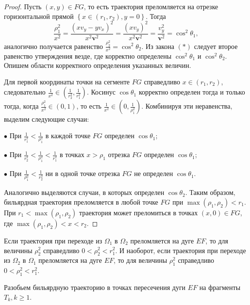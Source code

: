 \begin{proof}
Пусть $(x,y) \in FG$, то есть траектория преломляется на отрезке горизонтальной прямой $\left\{ x \in (r_1,r_2), y=0 \right\}$. Тогда 
$$\frac{\rho_1^2}{x^2} = \frac{(x v_y-y v_x)^2}{x^2 \textbf{v}^2} = \frac{(x v_y)^2}{x^2 \textbf{v}^2} = \frac{v_y^2}{\textbf{v}^2} = \cos^2\theta_1, $$
аналогично получается равенство $\frac{\rho_2^2}{x^2} = \cos^2 \theta_2$. Из закона $(\ast)$ следует второе равенство утверждения везде, где корректно определены $\cos^2 \theta_1$ и $\cos^2 \theta_2$.
Опишем области корректного определения указанных величин.

Для первой координаты точки на сегменте $FG$ справедливо $x \in (r_1, r_2)$, следовательно $\frac{1}{x^2} \in (\frac{1}{r_2^2}, \frac{1}{r_1^2})$.
Косинус $\cos \theta_1$ корректно определен тогда и только тогда, когда $\frac{\rho_1^2}{x^2} \in (0,1)$, то есть $\frac{1}{x^2} \in (0,\frac{1}{\rho_1^2})$.
Комбинируя эти неравенства, выделим следующие случаи:

$\bullet$ При $\frac{1}{r_1^2} < \frac{1}{\rho_1^2}$ в каждой точке $FG$ определен $\cos \theta_1$;

$\bullet$ При $\frac{1}{r_2^2} < \frac{1}{\rho_1^2} < \frac{1}{r_1^2}$ в точках $x > \rho_1$ отрезка $FG$ определен $\cos \theta_1$;

$\bullet$ При $\frac{1}{\rho_1^2} < \frac{1}{r_2^2}$ ни в одной точке отрезка  $FG$ не определен $\cos \theta_1$.

Аналогично выделяются случаи, в которых определен $\cos \theta_2$. 
Таким образом, бильярдная траектория преломляется в любой точке $FG$ при $\max( \rho_1, \rho_2) < r_1$. При $r_1 < \max( \rho_1, \rho_2)$ траектория может преломиться в точках $(x,0) \in FG$, где $\max( \rho_1, \rho_2)  <x < r_2$. 

\end{proof}

\begin{remark}
Если траектория при переходе из $\Omega_1$ в $\Omega_2$ преломляется на дуге $EF$, то для величины $\rho_2^2$ справедливо $0 < \rho_2^2 < r_1^2$. 
И наоборот, если траектория при переходе из $\Omega_2$ в $\Omega_1$  преломляется на дуге $EF$, то для величины $\rho_1^2$ справедливо $0 < \rho_1^2 < r_1^2$. 
\label{cons:branching_zone_origins}
\end{remark}

Разобьем бильярдную траекторию в точках пересечения дуги $EF$ на фрагменты $T_k, k \geq 1$. 



